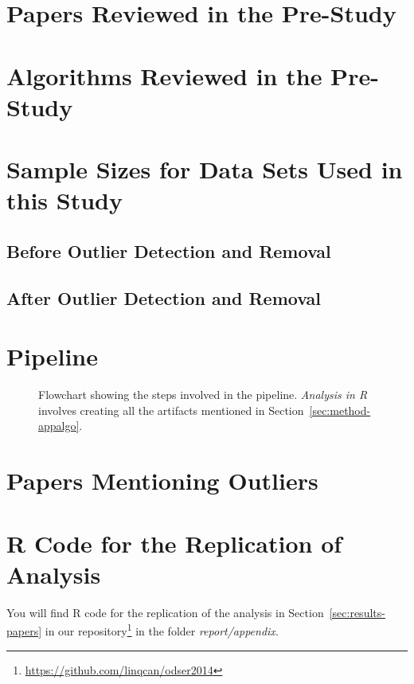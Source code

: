 \clearpage
\section{Papers Reviewed in the Pre-Study}
\label{sec:appendix-allpapers}





\clearpage
\section{Algorithms Reviewed in the Pre-Study}
\label{sec:appendix-allalgorithms}
\begin{landscape}

\end{landscape}




\clearpage
\section{Sample Sizes for Data Sets Used in this Study}
\subsection{Before Outlier Detection and Removal}
\label{sec:appendix-samplesizes}




\clearpage
\subsection{After Outlier Detection and Removal}
\label{sec:appendix-samplesizes-modified}




\clearpage
\section{Pipeline}
\label{sec:appendix-pipeline}
\begin{figure}[!h]
\centering
\caption{Flowchart showing the steps involved in the pipeline. \emph{Analysis in \textsf{R}} involves creating all the artifacts mentioned in Section~\ref{sec:method-appalgo}.}

\end{figure}




\clearpage
\section{Papers Mentioning Outliers}
\label{sec:appendix-odpaperstable}







\clearpage
\section{R Code for the Replication of Analysis}
\label{sec:appendix-codeforanalysis}
You will find R code for the replication of the analysis in Section~\ref{sec:results-papers} in our repository\footnote{\url{https://github.com/linqcan/odser2014}} in the folder \emph{report/appendix}.

